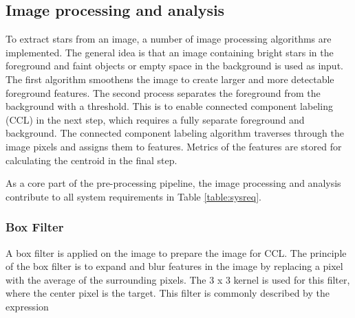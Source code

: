 \documentclass[12pt]{report}
\begin{document}
\subsection{Image processing and analysis}
To extract stars from an image, a number of image processing algorithms are implemented. The general idea is that an image containing bright stars in the foreground and faint objects or empty space in the background is used as input. The first algorithm smoothens the image to create larger and more detectable foreground features. The second process separates the foreground from the background with a threshold. This is to enable connected component labeling (CCL) in the next step, which requires a fully separate foreground and background. The connected component labeling algorithm traverses through the image pixels and assigns them to features. Metrics of the features are stored for calculating the centroid in the final step.
\par
As a core part of the pre-processing pipeline, the image processing and analysis contribute to all system requirements in Table \ref*{table:sysreq}.

\subsubsection{Box Filter}
A box filter is applied on the image to prepare the image for CCL. The principle of the box filter is to expand and blur features in the image by replacing a pixel with the average of the surrounding pixels. The 3 x 3 kernel is used for this filter, where the center pixel is the target. This filter is commonly described by the expression 
 
\end{document}
